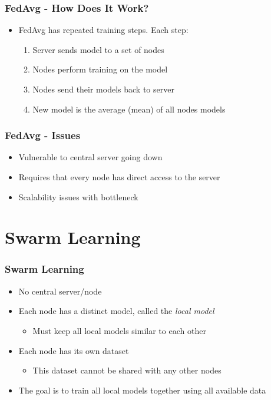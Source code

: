 \documentclass{beamer}
\begin{document}
	\begin{frame}
		\frametitle{FedAvg - How Does It Work?}
		\begin{itemize}
			\item FedAvg has repeated training steps. Each step:
			\begin{enumerate}
				\item Server sends model to a set of nodes
				\item Nodes perform training on the model
				\item Nodes send their models back to server
				\item New model is the average (mean) of all nodes models
			\end{enumerate}
		\end{itemize}
	\end{frame}

	\begin{frame}
		\frametitle{FedAvg - Issues}
		\begin{itemize}
			\item Vulnerable to central server going down
			\item Requires that every node has direct access to the server
			\item Scalability issues with bottleneck
		\end{itemize}
	\end{frame}

	\section{Swarm Learning}

	\begin{frame}
		\frametitle{Swarm Learning}
		\begin{itemize}
			\item No central server/node
			\item Each node has a distinct model, called the \emph{local model}
			\begin{itemize}
				\item Must keep all local models similar to each other
			\end{itemize}
			\item Each node has its own dataset
			\begin{itemize}
				\item This dataset cannot be shared with any other nodes
			\end{itemize}
			\item The goal is to train all local models together using all available data
		\end{itemize}
	\end{frame}
\end{document}
